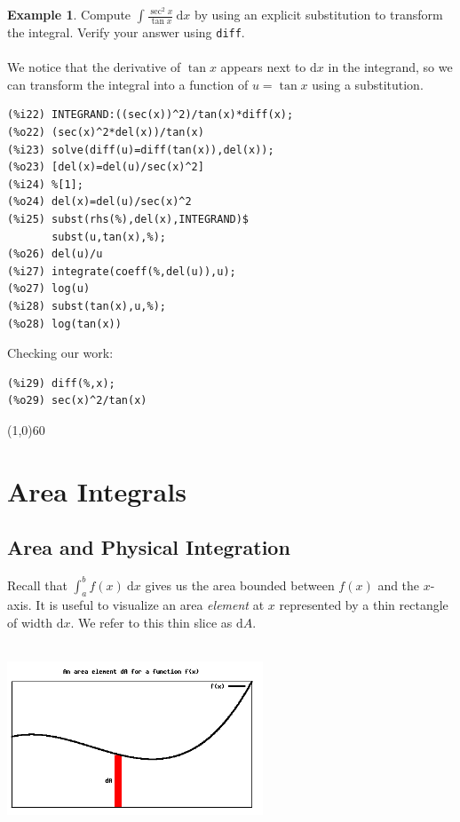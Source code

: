 \documentclass[10.5pt,twoside]{report}
\theoremstyle{definition}
\newtheorem{exmp}{Example}[section]
\begin{document}
\begin{exmp} Compute $\displaystyle \int \frac{\sec^2{x}}{\tan{x}} \ \mathrm{d}x$ by using an explicit substitution to transform the integral.  Verify your answer using \verb|diff|.\\
${}$\\

We notice that the derivative of $\tan{x}$ appears next to $\mathrm{d}x$ in the integrand, so we can transform the integral into a function of $u=\tan{x}$ using a substitution.

\begin{verbatim}
(%i22) INTEGRAND:((sec(x))^2)/tan(x)*diff(x);
(%o22) (sec(x)^2*del(x))/tan(x)
(%i23) solve(diff(u)=diff(tan(x)),del(x));
(%o23) [del(x)=del(u)/sec(x)^2]
(%i24) %[1];
(%o24) del(x)=del(u)/sec(x)^2
(%i25) subst(rhs(%),del(x),INTEGRAND)$
       subst(u,tan(x),%);
(%o26) del(u)/u
(%i27) integrate(coeff(%,del(u)),u);
(%o27) log(u)
(%i28) subst(tan(x),u,%);
(%o28) log(tan(x))
\end{verbatim}

Checking our work:

\begin{verbatim}
(%i29) diff(%,x);
(%o29) sec(x)^2/tan(x)
\end{verbatim}


\end{exmp}

\line(1,0){60}
\linethickness{0.5mm}


\pagebreak
\section{Area Integrals}\label{Area Integrals}

\subsection{Area and Physical Integration}

Recall that $\displaystyle \int_{a}^{b} f(x) \ \mathrm{d}x$ gives us the area bounded between $f(x)$ and the $x$-axis.  It is useful to visualize an area \textit{element} at $x$ represented by a thin rectangle of width $\mathrm{d}x$.  We refer to this thin slice as $\mathrm{d}A$.  \\
${}$\\

\begin{center}
\includegraphics[width=3in]{figure_7_3_1_1_1}
\end{center}
\end{document}

